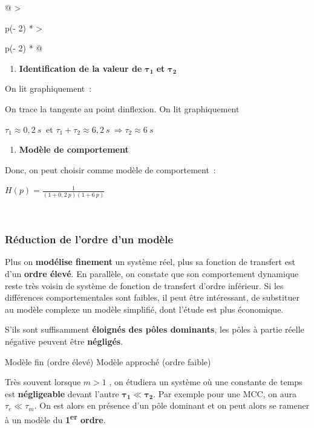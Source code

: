 \begin{longtable}[]{@{}
  >{\raggedright\arraybackslash}p{(\columnwidth - 2\tabcolsep) * }
  >{\raggedright\arraybackslash}p{(\columnwidth - 2\tabcolsep) * }@{}}
\begin{minipage}[b]{\linewidth}
\begin{enumerate}
\def\labelenumi{\arabic{enumi}.}
\setcounter{enumi}{2}
\item
  \textbf{Identification de la valeur de} \(\mathbf{\tau}_{\mathbf{1}}\) \textbf{et} \(\mathbf{\tau}_{\mathbf{2}}\)
\end{enumerate}

On lit graphiquement~:

On trace la tangente au point d\textquotesingle inflexion. On lit graphiquement

\(\tau_{1} \approx 0,2\ s\ \) et \(\tau_{1} + \tau_{2} \approx 6,2\ s\  \Longrightarrow \tau_{2} \approx 6\ s\)

\begin{enumerate}
\def\labelenumi{\arabic{enumi}.}
\setcounter{enumi}{3}
\item
  \textbf{Modèle de comportement}
\end{enumerate}

Donc, on peut choisir comme modèle de comportement~:

\(H(p) = \frac{1}{(1 + 0,2\ p)(1 + 6\ p)}\)\strut
\end{minipage} \\
\midrule\noalign{}
\endhead
\bottomrule\noalign{}
\endlastfoot
\end{longtable}

\hypertarget{ruxe9duction-de-lordre-dun-moduxe8le}{%
\subsubsection{Réduction de l'ordre d'un modèle}\label{ruxe9duction-de-lordre-dun-moduxe8le}}

Plus on \textbf{modélise finement} un système réel, plus sa fonction de transfert est d'un \textbf{ordre élevé}. En parallèle, on constate que son comportement dynamique reste très voisin de système de fonction de transfert d'ordre inférieur. Si les différences comportementales sont faibles, il peut être intéressant, de substituer au modèle complexe un modèle simplifié, dont l'étude est plus économique.

S'ils sont suffisamment \textbf{éloignés des pôles dominants}, les pôles à partie réelle négative peuvent être \textbf{négligés}.

Modèle fin (ordre élevé) Modèle approché (ordre faible)

Très souvent lorsque \(m > 1\) , on étudiera un système où une constante de temps est \textbf{négligeable} devant l'autre \(\mathbf{\tau}_{\mathbf{1}}\mathbf{\ll}\mathbf{\tau}_{\mathbf{2}}\). Par exemple pour une MCC, on aura \(\tau_{e} \ll \tau_{m}\). On est alors en présence d'un pôle dominant et on peut alors se ramener à un modèle du \textbf{1\textsuperscript{er} ordre}.

